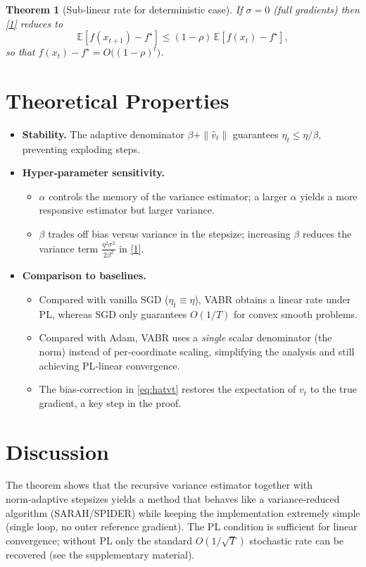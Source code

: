 \documentclass{article}
\newtheorem{theorem}{Theorem}
\newcommand{\E}{\mathbb{E}}
\begin{document}
\begin{theorem}[Sub‑linear rate for deterministic case]\label{thm:sublinear}
If $\sigma=0$ (full gradients) then \eqref{1} reduces to
\[
\E\!\left[f(x_{t+1})-f^{\star}\right]\le(1-\rho)\,\E\!\left[f(x_{t})-f^{\star}\right],
\]
so that $f(x_{t})-f^{\star}=O\!\bigl((1-\rho)^{t}\bigr)$.
\end{theorem}

\section{Theoretical Properties}
\begin{itemize}
    \item \textbf{Stability.} The adaptive denominator $\beta+\|\hat v_t\|$ guarantees $\eta_t\le\eta/\beta$, preventing exploding steps.
    \item \textbf{Hyper‑parameter sensitivity.}
    \begin{itemize}
        \item $\alpha$ controls the memory of the variance estimator; a larger $\alpha$ yields a more responsive estimator but larger variance.
        \item $\beta$ trades off bias versus variance in the stepsize; increasing $\beta$ reduces the variance term $\frac{\eta^{2}\sigma^{2}}{2\beta^{2}}$ in \eqref{1}.
    \end{itemize}
    \item \textbf{Comparison to baselines.}
    \begin{itemize}
        \item Compared with vanilla SGD ($\eta_t\equiv\eta$), VABR obtains a linear rate under PL, whereas SGD only guarantees $O(1/T)$ for convex smooth problems.
        \item Compared with Adam, VABR uses a \emph{single} scalar denominator (the norm) instead of per‑coordinate scaling, simplifying the analysis and still achieving PL‑linear convergence.
        \item The bias‑correction in \eqref{eq:hatvt} restores the expectation of $v_t$ to the true gradient, a key step in the proof.
    \end{itemize}
\end{itemize}

\section{Discussion}
The theorem shows that the recursive variance estimator together with norm‑adaptive stepsizes yields a method that behaves like a variance‑reduced algorithm (SARAH/SPIDER) while keeping the implementation extremely simple (single loop, no outer reference gradient). The PL condition is sufficient for linear convergence; without PL only the standard $O(1/\sqrt{T})$ stochastic rate can be recovered (see the supplementary material).
\end{document}
